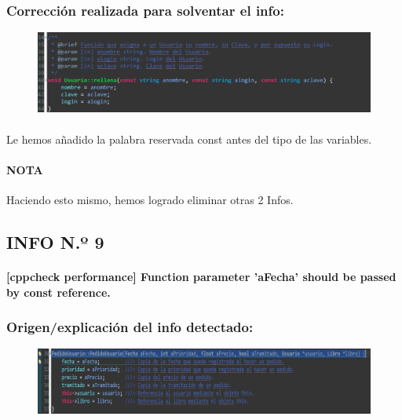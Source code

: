 		\subsubsection{Corrección realizada para solventar el info:}
		
			\begin{figure}[H]
				\centering
				\includegraphics[scale=0.55]{img/esteban13.png}
				\label{esteban13}
			\end{figure}
		
			\paragraph{}Le hemos añadido la palabra reservada const antes del tipo de las variables.
			
			\paragraph{NOTA}Haciendo esto mismo, hemos logrado eliminar otras 2 Infos.
	\subsection{INFO N.º 9}
	
		\paragraph{[cppcheck performance] Function parameter 'aFecha' should be passed by const reference.}
	
		\subsubsection{Origen/explicación del info detectado:}
		
			\begin{figure}[H]
				\centering
				\includegraphics[scale=0.55]{img/esteban14.png}
				\label{esteban14}
			\end{figure}	
		
